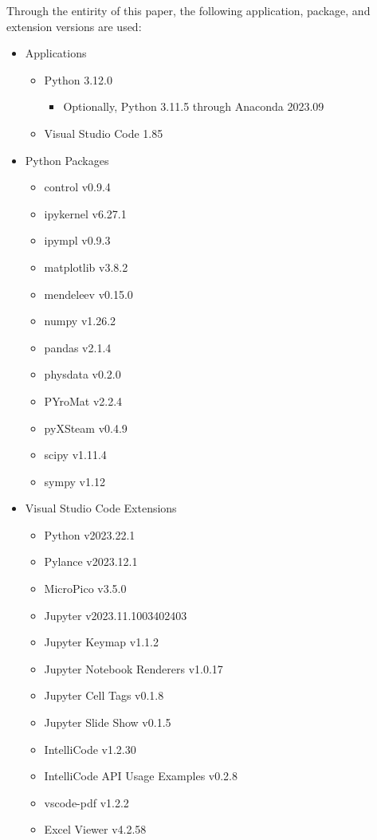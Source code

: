 Through the entirity of this paper, the following application, package, and extension versions are used:

\begin{itemize}
    \item Applications
    \begin{itemize}
        \item Python 3.12.0
            \begin{itemize}
                \item Optionally, Python 3.11.5 through Anaconda 2023.09
            \end{itemize}
        \item Visual Studio Code 1.85
    \end{itemize}
    \item Python Packages
    \begin{itemize}
        \item control v0.9.4
        \item ipykernel v6.27.1
        \item ipympl v0.9.3
        \item matplotlib v3.8.2
        \item mendeleev v0.15.0
        \item numpy v1.26.2
        \item pandas v2.1.4
        \item physdata v0.2.0
        \item PYroMat v2.2.4
        \item pyXSteam v0.4.9
        \item scipy v1.11.4
        \item sympy v1.12
    \end{itemize}
    \item Visual Studio Code Extensions
    \begin{itemize}
        \item Python v2023.22.1
        \item Pylance v2023.12.1
        \item MicroPico v3.5.0
        \item Jupyter v2023.11.1003402403
        \item Jupyter Keymap v1.1.2
        \item Jupyter Notebook Renderers v1.0.17 
        \item Jupyter Cell Tags v0.1.8
        \item Jupyter Slide Show v0.1.5
        \item IntelliCode v1.2.30
        \item IntelliCode API Usage Examples v0.2.8
        \item vscode-pdf v1.2.2
        \item Excel Viewer v4.2.58
    \end{itemize}
\end{itemize}